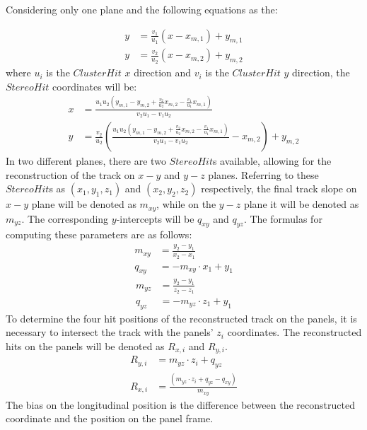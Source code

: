Considering only one plane and the following 
equations as the:

\begin{equation}
    \begin{aligned}
        y&=\frac{v_1}{u_1}(x-x_{m,1})+y_{m,1} \\
        y&=\frac{v_2}{u_2}(x-x_{m,2})+y_{m,2} 
    \end{aligned}
    \end{equation}
where $u_i$ is the $ClusterHit$ $x$ direction and $v_i$ is the $ClusterHit$ $y$ direction, the $StereoHit$ coordinates will be:
\begin{equation}\label{x}
    \begin{aligned}
x&=\frac{u_1 u_2(y_{m,1}-y_{m,2}+\frac{v_2}{u_2}x_{m,2}-\frac{v_1}{u_1}x_{m,1})}{v_2 u_1 - v_1 u_2}\\
y&=\frac{v_2}{u_2}\left(\frac{u_1 u_2(y_{m,1}-y_{m,2}+\frac{v_2}{u_2}x_{m,2}-\frac{v_1}{u_1}x_{m,1})}{v_2 u_1 - v_1 u_2}-x_{m,2}\right)+y_{m,2}
\end{aligned}
\end{equation}
In two different planes, there are two $StereoHit$s available, allowing for the reconstruction of the track on $x-y$ and $y-z$ planes. 
Referring to these $StereoHit$s as $(x_1,y_1,z_1)$ and $(x_2,y_2,z_2)$ respectively, the final track slope on $x-y$ plane will be 
denoted as $m_{xy}$, while on the $y-z$ plane it will be denoted as $m_{yz}$. The corresponding $y$-intercepts will be $q_{xy}$ and $q_{yz}$.
The formulas for computing these parameters are as follows:
\begin{equation}
    \begin{aligned}
m_{xy}&=\frac{y_2-y_1}{x_2-x_1}\\
q_{xy}&=-m_{xy} \cdot x_1+y_1
\end{aligned}
\end{equation}
\begin{equation}
    \begin{aligned}
m_{yz}&=\frac{y_2-y_1}{z_2-z_1}\\
q_{yz}&=-m_{yz} \cdot z_1+y_1
\end{aligned}
\end{equation}
To determine the four hit positions of the reconstructed track on the panels, it is necessary to intersect the track with the panels' $z_i$ coordinates. 
The reconstructed hits on the panels will be denoted as $R_{x,i}$ and $R_{y,i}$.
\begin{equation}
    \begin{aligned}
 R_{y,i}&=m_{yz}\cdot z_i+q_{yz}\\
 R_{x,i}&=\frac{(m_{yz}\cdot z_i+q_{yz}-q_{xy})}{m_{xy}}
\end{aligned}
\end{equation}
The bias on the longitudinal position is the difference between 
the reconstructed coordinate and the  position 
on the panel frame.

